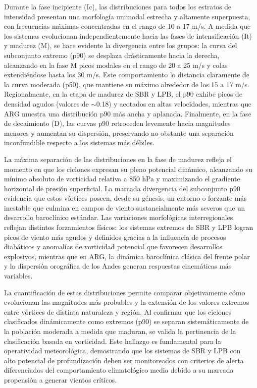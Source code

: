 Durante la fase incipiente (Ic), las distribuciones para todos los estratos de intensidad presentan una morfología unimodal estrecha y altamente superpuesta, con frecuencias máximas concentradas en el rango de 10 a 17 m/s. A medida que los sistemas evolucionan independientemente hacia las fases de intensificación (It) y madurez (M), se hace evidente la divergencia entre los grupos: la curva del subconjunto extremo (p90) se desplaza drásticamente hacia la derecha, alcanzando en la fase M picos modales en el rango de 20 a 25 m/s y colas extendiéndose hasta los 30 m/s. Este comportamiento lo distancia claramente de la curva moderada (p50), que mantiene su máximo alrededor de los 15 a 17 m/s. Regionalmente, en la etapa de madurez de SBR y LPB, el p90 exhibe picos de densidad agudos (valores de $\sim$0.18) y acotados en altas velocidades, mientras que ARG muestra una distribución p90 más ancha y aplanada. Finalmente, en la fase de decaimiento (D), las curvas p90 retroceden levemente hacia magnitudes menores y aumentan su dispersión, preservando no obstante una separación inconfundible respecto a los sistemas más débiles.

La máxima separación de las distribuciones en la fase de madurez refleja el momento en que los ciclones expresan su pleno potencial dinámico, alcanzando su mínimo absoluto de vorticidad relativa a 850 hPa y maximizando el gradiente horizontal de presión superficial. La marcada divergencia del subconjunto p90 evidencia que estos vórtices poseen, desde su génesis, un entorno o forzante más inestable que culmina en campos de viento sustancialmente más severos que un desarrollo baroclínico estándar. Las variaciones morfológicas interregionales reflejan distintos forzamientos físicos: los sistemas extremos de SBR y LPB logran picos de viento más agudos y definidos gracias a la influencia de procesos diabáticos y anomalías de vorticidad potencial que favorecen desarrollos explosivos, mientras que en ARG, la dinámica baroclínica clásica del frente polar y la dispersión orográfica de los Andes generan respuestas cinemáticas más variables.

La cuantificación de estas distribuciones permite comparar objetivamente cómo evolucionan las magnitudes más probables y la extensión de los valores extremos entre vórtices de distinta naturaleza y región. Al confirmar que los ciclones clasificados dinámicamente como extremos (p90) se separan sistemáticamente de la población moderada a medida que maduran, se valida la pertinencia de la clasificación basada en vorticidad. Este hallazgo es fundamental para la operatividad meteorológica, demostrando que los sistemas de SBR y LPB con alto potencial de profundización deben ser monitoreados con criterios de alerta diferenciados del comportamiento climatológico medio debido a su marcada propensión a generar vientos críticos.


